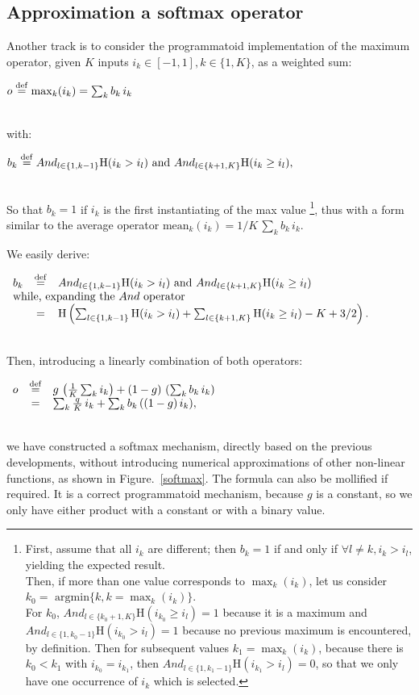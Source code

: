 \documentclass[a4]{article} \usepackage[left=2cm,right=3cm,top=1cm,bottom=2cm]{geometry}
\newcommand{\eqline}[1]{~\vspace{0.1cm}\\\centerline{$#1$}\vspace{0.1cm}\\}
\newcommand{\defq}{\stackrel {\rm def}{=}}
\begin{document}
\subsection{Approximation a softmax operator}

Another track is to consider the programmatoid implementation of the maximum operator, given $K$ inputs $i_k \in [-1, 1], k \in \{1, K\}$, as a weighted sum:
\eqline{o \defq \max_k(i_k) = \sum_k b_k \, i_k}
with:
\eqline{b_k \defq And_{l \in \{1, k-1\}} \mbox{H}(i_k >  i_l) \mbox{ and } And_{l \in \{k+1, K\}} \mbox{H}(i_k \ge i_l),}
So that $b_k = 1$ if $i_k$ is the first instantiating of the max value \footnote{
First, assume that all $i_k$ are different; then $b_k = 1$ if and only if $\forall l \ne k, i_k > i_l$, yielding the expected result.\\
Then, if more than one value corresponds to $\max_k(i_k)$, let us consider $k_0 = \mbox{ argmin} \{k, k = \max_k(i_k)\}$. \\
For $k_0$, $And_{l \in \{k_0+1, K\}} \mbox{H}(i_{k_0} \ge i_l) = 1$ because it is a maximum and $And_{l \in \{1, k_0-1\}} \mbox{H}(i_{k_0} >  i_l) =1$ because no previous maximum is encountered, by definition. Then for subsequent values $k_1 = \max_k(i_k)$, because there is $k_0 < k_1$ with $i_{k_0} = i_{k_1}$, then $And_{l \in \{1, k_1-1\}} \mbox{H}(i_{k_1} >  i_l) = 0$, so that we only have one occurrence of $i_k$ which is selected.}, thus with a form similar to the average operator $\mbox{mean}_k(i_k) = 1/K \, \sum_k b_k \, i_k$.

We easily derive:
\eqline{\begin{array}{rcl}
    b_k &\defq& And_{l \in \{1, k-1\}} \mbox{H}(i_k >  i_l) \mbox{ and } And_{l \in \{k+1, K\}} \mbox{H}(i_k \ge i_l) \\
    \multicolumn{3}{l}{\mbox{while, expanding the $And$ operator}}\\
    &=&  \mbox{H}\left(\sum_{l \in \{1, k-1\}}  \mbox{H}(i_k >  i_l) + \sum_{l \in \{k+1, K\}} \mbox{H}(i_k \ge i_l) - K + 3/2\right). \\
\end{array}}

Then, introducing a linearly combination of both operators:
\eqline{\begin{array}{rcl}
    o &\defq& g \, \left(\frac{1}{K} \sum_k i_k \right) + (1-g) \, \left(\sum_k b_k \, i_k \right) \\
   &=& \sum_k \frac{q}{K} \, i_k + \sum_k b_k \, ((1-g)  \, i_k), \\
\end{array}}
we have constructed  a softmax mechanism, directly based on the previous developments, without introducing numerical approximations of other non-linear functions, as shown in Figure.~\ref{softmax}. The formula can also be mollified if required.
It is a correct programmatoid mechanism, because $g$ is a constant, so we only have either product with a constant or with a binary value.
\end{document}
